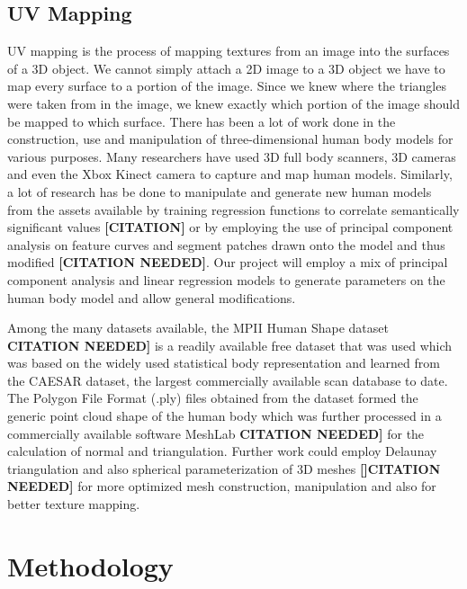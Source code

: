 \documentclass{article}
\begin{document}
    \subsection {UV Mapping}
UV mapping is the process of mapping textures from an image into the surfaces of a 3D object. We cannot simply attach a 2D image to a 3D object we have to map every surface to a portion of the image. Since we knew where the triangles were taken from in the image, we knew exactly which portion of the image should be mapped to which surface.
There has been a lot of work done in the construction, use and manipulation of three-dimensional human body models for various purposes. Many researchers have used 3D full body scanners, 3D cameras and even the Xbox Kinect camera to capture and map human models. Similarly, a lot of research has be done to manipulate and generate new human models from the assets available by training regression functions to correlate semantically significant values \textbf{[CITATION]} or by employing the use of principal component analysis on feature curves and segment patches drawn onto the model and thus modified \textbf{[CITATION NEEDED]}. Our project will employ a mix of principal component analysis and linear regression models to generate parameters on the human body model and allow general modifications.

Among the many datasets available, the MPII Human Shape dataset \textbf{ CITATION NEEDED]} is a readily available free dataset that was used which was based on the widely used statistical body representation and learned from the CAESAR dataset, the largest commercially available scan database to date. The Polygon File Format (.ply) files obtained from the dataset formed the generic point cloud shape of the human body which was further processed in a commercially available software MeshLab \textbf{ CITATION NEEDED]} for the calculation of normal and triangulation. Further work could employ Delaunay triangulation and also spherical parameterization of 3D meshes \textbf{[]CITATION NEEDED]} for more optimized mesh construction, manipulation and also for better texture mapping.

\newpage
\section{Methodology}
\end{document}
